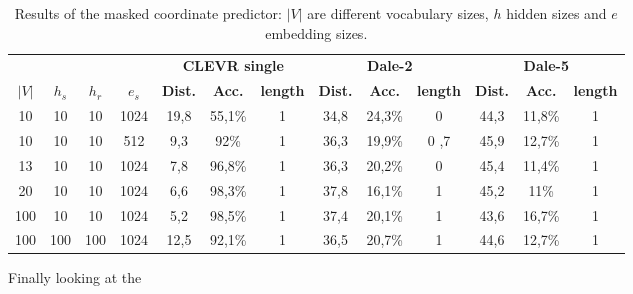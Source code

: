 \begin{table}[h]
    \centering
    \begin{tabular}{cccc|ccc|ccc|ccc}
        \toprule
              &         &          &         & \multicolumn{3}{c}{\textbf{CLEVR single}} & \multicolumn{3}{c}{\textbf{Dale-2}} & \multicolumn{3}{c}{\textbf{Dale-5}}                                                                                                       \\\cmidrule(lr){5-7}\cmidrule(lr){8-10}\cmidrule(lr){11-13}
        $|V|$ & $h_{s}$ & $h_{r}$  & $e_{s}$ & \textbf{Dist.}                            & \textbf{Acc.}                       & \textbf{length}                     & \textbf{Dist.} & \textbf{Acc.} & \textbf{length} & \textbf{Dist.} & \textbf{Acc.} & \textbf{length} \\\midrule
        {10}  & {10}    & {10}     & {1024}  & {19,8}                                    & {55,1\%}                            & {1}                                 & {34,8}         & {24,3\%}      & {0}             & {44,3}         & {11,8\%}      & {1}             \\
        {10}  & {10}    & {10}     & {512}   & {9,3}                                     & {92\%}                              & {1}                                 & {36,3}         & {19,9\%}      & {0
        ,7}   & {45,9}  & {12,7\%} & {1}                                                                                                                                                                                                                                   \\
        {13}  & {10}    & {10}     & {1024}  & {7,8}                                     & {96,8\%}                            & {1}                                 & {36,3}         & {20,2\%}      & {0}             & {45,4}         & {11,4\%}      & {1}             \\
        {20}  & {10}    & {10}     & {1024}  & {6,6}                                     & {98,3\%}                            & {1}                                 & {37,8}         & {16,1\%}      & {1}             & {45,2}         & {11\%}        & {1}             \\
        {100} & {10}    & {10}     & {1024}  & {5,2}                                     & {98,5\%}                            & {1}                                 & {37,4}         & {20,1\%}      & {1}             & {43,6}         & {16,7\%}      & {1}             \\
        {100} & {100}   & {100}    & {1024}  & {12,5}                                    & {92,1\%}                            & {1}                                 & {36,5}         & {20,7\%}      & {1}             & {44,6}         & {12,7\%}      & {1}             \\
        \bottomrule
    \end{tabular}
    \caption{Results of the masked coordinate predictor: $|V|$ are different vocabulary sizes, $h$ hidden sizes and $e$ embedding sizes.}
    \label{tab:results_masked_predictor_game}
\end{table}

Finally looking at the
